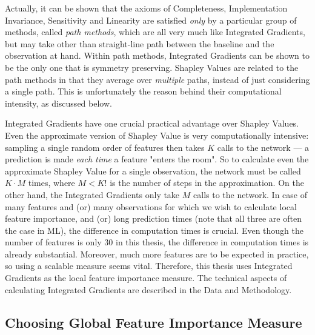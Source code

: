 {			Actually, it can be shown \citep{sundararajan2017axiomatic} that the axioms of Completeness, Implementation Invariance, Sensitivity and Linearity are satisfied \textit{only} by a particular group of methods, called \textit{path methods}, which are all very much like Integrated Gradients, but may take other than straight-line path between the baseline and the observation at hand. Within path methods, Integrated Gradients can be shown \citep{sundararajan2017axiomatic} to be the only one that is symmetry preserving. Shapley Values are related to the path methods in that they average over \textit{multiple} paths, instead of just considering a single path. This is unfortunately the reason behind their computational intensity, as discussed below.  
			
			Integrated Gradients have one crucial practical advantage over Shapley Values. Even the approximate version of Shapley Value \citep{vstrumbelj2014explaining} is very computationally intensive: sampling a single random order of features then takes $K$ calls to the network --- a prediction is made \textit{each time} a feature "enters the room". So to calculate even the approximate Shapley Value for a single observation, the network must be called $K\cdot M$ times, where $M < K!$ is the number of steps in the approximation. On the other hand, the Integrated Gradients only take $M$ calls to the network. In case of many features and (or) many observations for which we wish to calculate local feature importance, and (or) long prediction times (note that all three are often the case in ML), the difference in computation times is crucial. Even though the number of features is only 30 in this thesis, the difference in computation times is already substantial. Moreover, much more features are to be expected in practice, so using a scalable measure seems vital. Therefore, this thesis uses Integrated Gradients as the local feature importance measure. The technical aspects of calculating Integrated Gradients are described in the Data and Methodology. 
		
		
		\subsection{Choosing Global Feature Importance Measure} 
		
}
